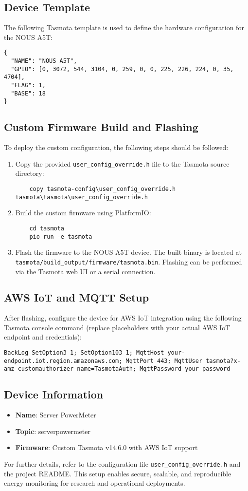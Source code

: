 \subsection{Device Template}
The following Tasmota template is used to define the hardware configuration for the NOUS A5T:
\begin{lstlisting}
{
  "NAME": "NOUS A5T",
  "GPIO": [0, 3072, 544, 3104, 0, 259, 0, 0, 225, 226, 224, 0, 35, 4704],
  "FLAG": 1,
  "BASE": 18
}
\end{lstlisting}

\subsection{Custom Firmware Build and Flashing}
To deploy the custom configuration, the following steps should be followed:
\begin{enumerate}
    \item Copy the provided \texttt{user\_config\_override.h} file to the Tasmota source directory:
    \begin{lstlisting}
    copy tasmota-config\user_config_override.h tasmota\tasmota\user_config_override.h
    \end{lstlisting}
    \item Build the custom firmware using PlatformIO:
    \begin{lstlisting}
    cd tasmota
    pio run -e tasmota
    \end{lstlisting}
    \item Flash the firmware to the NOUS A5T device. The built binary is located at \lstinline|tasmota/build_output/firmware/tasmota.bin|. Flashing can be performed via the Tasmota web UI or a serial connection.
\end{enumerate}

\subsection{AWS IoT and MQTT Setup}
After flashing, configure the device for AWS IoT integration using the following Tasmota console command (replace placeholders with your actual AWS IoT endpoint and credentials):
\begin{lstlisting}
BackLog SetOption3 1; SetOption103 1; MqttHost your-endpoint.iot.region.amazonaws.com; MqttPort 443; MqttUser tasmota?x-amz-customauthorizer-name=TasmotaAuth; MqttPassword your-password
\end{lstlisting}

\subsection{Device Information}
\begin{itemize}
    \item \textbf{Name}: Server PowerMeter
    \item \textbf{Topic}: serverpowermeter
    \item \textbf{Firmware}: Custom Tasmota v14.6.0 with AWS IoT support
\end{itemize}

For further details, refer to the configuration file \texttt{user\_config\_override.h} and the project README. This setup enables secure, scalable, and reproducible energy monitoring for research and operational deployments.
